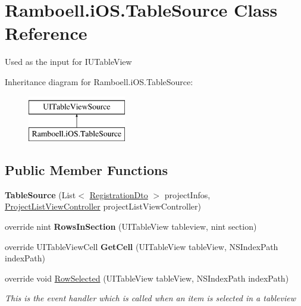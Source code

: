 \hypertarget{class_ramboell_1_1i_o_s_1_1_table_source}{}\section{Ramboell.\+i\+O\+S.\+Table\+Source Class Reference}
\label{class_ramboell_1_1i_o_s_1_1_table_source}


Used as the input for I\+U\+Table\+View  


Inheritance diagram for Ramboell.\+i\+O\+S.\+Table\+Source\+:\begin{figure}[H]
\begin{center}
\leavevmode
\includegraphics[height=2.000000cm]{class_ramboell_1_1i_o_s_1_1_table_source}
\end{center}
\end{figure}
\subsection*{Public Member Functions}
\begin{DoxyCompactItemize}
\item 
\mbox{\label{class_ramboell_1_1i_o_s_1_1_table_source_a5fb8505918e88892eabd85c6dec8b497}} 
{\bfseries Table\+Source} (List$<$ \hyperlink{class_ramboell_1_1i_o_s_1_1_registration_dto}{Registration\+Dto} $>$ project\+Infos, \hyperlink{class_ramboell_1_1i_o_s_1_1_project_list_view_controller}{Project\+List\+View\+Controller} project\+List\+View\+Controller)
\item 
\mbox{\label{class_ramboell_1_1i_o_s_1_1_table_source_a1a8e92696ee9117753ece243e4cddfe0}} 
override nint {\bfseries Rows\+In\+Section} (U\+I\+Table\+View tableview, nint section)
\item 
\mbox{\label{class_ramboell_1_1i_o_s_1_1_table_source_a7bd63e83a5b5a86d5143bf4645ad70c6}} 
override U\+I\+Table\+View\+Cell {\bfseries Get\+Cell} (U\+I\+Table\+View table\+View, N\+S\+Index\+Path index\+Path)
\item 
override void \hyperlink{class_ramboell_1_1i_o_s_1_1_table_source_aeb3dbc467781e4e4fed884e82e6719b1}{Row\+Selected} (U\+I\+Table\+View table\+View, N\+S\+Index\+Path index\+Path)
\begin{DoxyCompactList}\small\item\em This is the event handler which is called when an item is selected in a tableview \end{DoxyCompactList}\end{DoxyCompactItemize}

